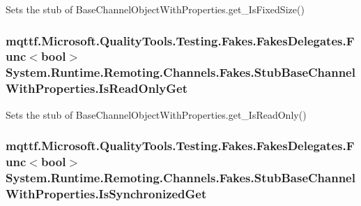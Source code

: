 Sets the stub of Base\-Channel\-Object\-With\-Properties.\-get\-\_\-\-Is\-Fixed\-Size()

\hypertarget{class_system_1_1_runtime_1_1_remoting_1_1_channels_1_1_fakes_1_1_stub_base_channel_with_properties_aa4b50f3d1f09895cc77e28c118f64020}{
\subsubsection[{Is\-Read\-Only\-Get}]{\setlength{\rightskip}{0pt plus 5cm}mqttf.\-Microsoft.\-Quality\-Tools.\-Testing.\-Fakes.\-Fakes\-Delegates.\-Func$<$bool$>$ System.\-Runtime.\-Remoting.\-Channels.\-Fakes.\-Stub\-Base\-Channel\-With\-Properties.\-Is\-Read\-Only\-Get}}\label{class_system_1_1_runtime_1_1_remoting_1_1_channels_1_1_fakes_1_1_stub_base_channel_with_properties_aa4b50f3d1f09895cc77e28c118f64020}


Sets the stub of Base\-Channel\-Object\-With\-Properties.\-get\-\_\-\-Is\-Read\-Only()

\hypertarget{class_system_1_1_runtime_1_1_remoting_1_1_channels_1_1_fakes_1_1_stub_base_channel_with_properties_aa42b86a438ebd954e66688c651c8c683}{
\subsubsection[{Is\-Synchronized\-Get}]{\setlength{\rightskip}{0pt plus 5cm}mqttf.\-Microsoft.\-Quality\-Tools.\-Testing.\-Fakes.\-Fakes\-Delegates.\-Func$<$bool$>$ System.\-Runtime.\-Remoting.\-Channels.\-Fakes.\-Stub\-Base\-Channel\-With\-Properties.\-Is\-Synchronized\-Get}}\label{class_system_1_1_runtime_1_1_remoting_1_1_channels_1_1_fakes_1_1_stub_base_channel_with_properties_aa42b86a438ebd954e66688c651c8c683}


